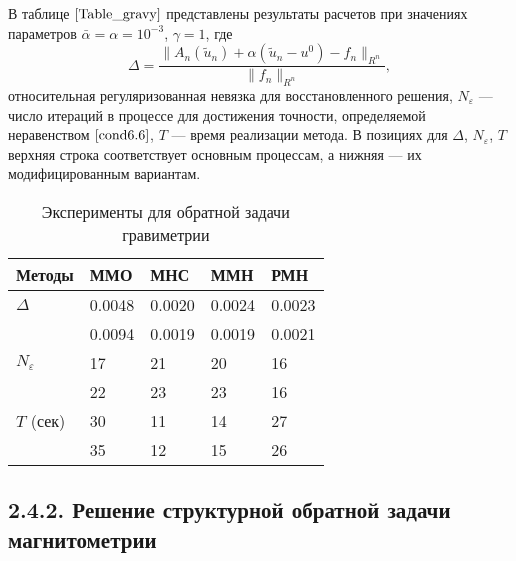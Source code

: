 В таблице $\ref{Table_gravy}$ представлены результаты расчетов при значениях параметров $\bar\alpha=\alpha=10^{-3}$, $\gamma=1$, где
\begin{equation}\label{form6.7}
\Delta=\frac{\|A_n(\tilde{u}_n)+\alpha(\tilde{u}_n-u^0)-f_n\|_{R^n}}{\|f_n\|_{R^n}},
\end{equation}
относительная регуляризованная невязка для восстановленного решения, $N_\varepsilon$ --- число итераций в процессе для достижения точности, определяемой неравенством $\eqref{cond6.6}$, $T$ --- время реализации метода. В позициях для $\Delta$, $N_\varepsilon$, $T$ верхняя строка соответствует основным процессам, а нижняя --- их модифицированным вариантам.
\begin{table}[H]
	\centering
	\renewcommand{\arraystretch}{1.5}
	\caption{Эксперименты для обратной задачи гравиметрии}
	\label{Table_gravy}
	\begin{tabular}{|p{}|p{}|p{}|p{}|p{}|}
		\hline
		\rule{0cm}{0.5cm}
		\textbf{Методы} & \textbf{ММО} & \textbf{МНС} & \textbf{ММН} & \textbf{РМН} \\ \hline
		\rule{0cm}{0.5cm}
		{$\Delta$} & 0.0048 & 0.0020 & 0.0024 & 0.0023	 \\ \cline{2-5} 
		\rule{0cm}{0.5cm}
		&  0.0094   & 0.0019    &  0.0019   &  0.0021   \\ \hline
		\rule{0cm}{0.5cm}
		{$N_\varepsilon$} & 17  &  21   &   20  &  16    \\ \cline{2-5}
		\rule{0cm}{0.5cm}
		&  22   &   23  &  23   &  16   \\ \hline
		\rule{0cm}{0.5cm}
		{$T$ (сек)}    &  30   &  11   &  14  & 27    \\ \cline{2-5}
		\rule{0cm}{0.5cm}
		& 35   & 12    &  15   &   26  \\ \hline
	\end{tabular}
\end{table}

\subsection*{2.4.2. Решение структурной обратной задачи магнитометрии}
 
